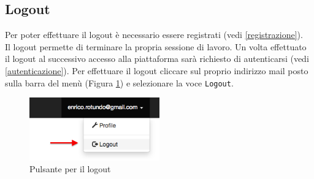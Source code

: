 	\clearpage
	\subsection{Logout}
		\label{logout}

			Per poter effettuare il logout è necessario essere registrati (vedi \ref{registrazione}). \\
			Il logout permette di terminare la propria sessione di lavoro. Un volta effettuato il logout al successivo accesso alla piattaforma sarà richiesto di autenticarsi (vedi \ref{autenticazione}). Per effettuare il logout cliccare sul proprio indirizzo mail posto sulla barra del menù (Figura \ref{fig:logout}) e selezionare la voce \texttt{Logout}.

			\begin{figure}[H]
				\centering \includegraphics[width=0.5\textwidth]{img/logout.png}
			\caption{ \label{fig:logout} Pulsante per il logout}
			\end{figure}

	\clearpage
